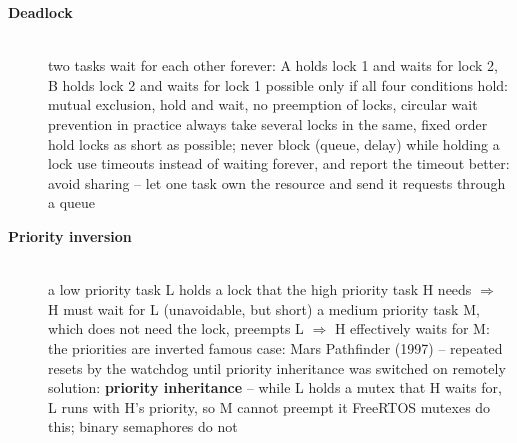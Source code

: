 \begin{description}
\item[{\rot\bf Deadlock}]~\\[-\lblskip]
\bi
	\ite two tasks wait for each other forever: A holds lock 1 and waits for lock 2, B holds lock 2 and waits for lock 1
	\ite possible only if all four conditions hold: mutual exclusion, hold and wait, no preemption of locks, circular wait
	\ite prevention in practice
	\bi
		\ite always take several locks in the same, fixed order
		\ite hold locks as short as possible; never block (queue, delay) while holding a lock
		\ite use timeouts instead of waiting forever, and report the timeout
		\ite better: avoid sharing -- let one task own the resource and send it requests through a queue
	\ei
\ei
\os{\newpage}

\item[{\rot\bf Priority inversion}]~\\[-\lblskip]
\bi
	\ite a low priority task L holds a lock that the high priority task H needs $\Rightarrow$ H must wait for L (unavoidable, but short)
	\ite a medium priority task M, which does not need the lock, preempts L $\Rightarrow$ H effectively waits for M: the priorities are inverted
	\ite famous case: Mars Pathfinder (1997) -- repeated resets by the watchdog until priority inheritance was switched on remotely
	\ite solution: \textbf{priority inheritance} -- while L holds a mutex that H waits for, L runs with H's priority, so M cannot preempt it
	\bi
		\ite FreeRTOS mutexes do this; binary semaphores do not
	\ei
\ei
\begin{figure}[!hbtp]
\begin{center}
\end{center}
\end{figure}
\end{description}
